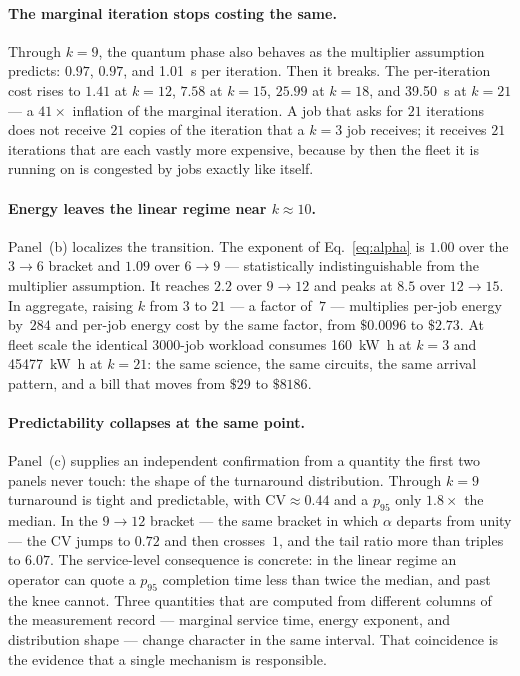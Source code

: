 \paragraph{The marginal iteration stops costing the same.}
Through $k=9$, the quantum phase also behaves as the multiplier assumption
predicts: $0.97$, $0.97$, and \qty{1.01}{\second} per iteration. Then it breaks.
The per-iteration cost rises to $1.41$ at $k=12$, $7.58$ at $k=15$, $25.99$ at
$k=18$, and \qty{39.50}{\second} at $k=21$ --- a $41\times$ inflation of the
marginal iteration. A job that asks for $21$ iterations does not receive $21$
copies of the iteration that a $k=3$ job receives; it receives $21$ iterations
that are each vastly more expensive, because by then the fleet it is running on
is congested by jobs exactly like itself.

\paragraph{Energy leaves the linear regime near $k \approx 10$.}
Panel~(b) localizes the transition. The exponent of Eq.~\eqref{eq:alpha} is
$1.00$ over the $3\rightarrow 6$ bracket and $1.09$ over $6 \rightarrow 9$ ---
statistically indistinguishable from the multiplier assumption. It reaches
$2.2$ over $9 \rightarrow 12$ and peaks at $8.5$ over $12 \rightarrow 15$. In
aggregate, raising $k$ from $3$ to $21$ --- a factor of~$7$ --- multiplies
per-job energy by~$284$ and per-job energy cost by the same factor, from
$\$0.0096$ to $\$2.73$. At fleet scale the identical $3000$-job workload
consumes \qty{160}{\kilo\watt\hour} at $k=3$ and
\qty{45477}{\kilo\watt\hour} at $k=21$: the same science, the same circuits,
the same arrival pattern, and a bill that moves from $\$29$ to $\$8186$.

\paragraph{Predictability collapses at the same point.}
Panel~(c) supplies an independent confirmation from a quantity the first two
panels never touch: the shape of the turnaround distribution. Through $k=9$
turnaround is tight and predictable, with $\mathrm{CV} \approx 0.44$ and a
$p_{95}$ only $1.8\times$ the median. In the $9 \rightarrow 12$ bracket --- the
same bracket in which $\alpha$ departs from unity --- the CV jumps to $0.72$
and then crosses~$1$, and the tail ratio more than triples to $6.07$. The
service-level consequence is concrete: in the linear regime an operator can
quote a $p_{95}$ completion time less than twice the median, and past the knee
cannot. Three quantities that are computed from different columns of the
measurement record --- marginal service time, energy exponent, and distribution
shape --- change character in the same interval. That coincidence is the
evidence that a single mechanism is responsible.

